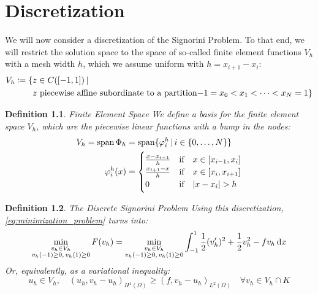 \documentclass[headsepline,footsepline,footinclude=false,oneside,fontsize=11pt,paper=a4,listof=totoc,bibliography=totoc]{scrbook} %
\newtheorem{definition}{Definition}
\begin{document}
\chapter{Discretization}
We will now consider a discretization of the Signorini Problem. To that end, we will restrict the solution space to the space of so-called finite element functions $V_h$ with a mesh width $h$, which we assume uniform with $h = x_{i+1} - x_i$:
\begin{align}
V_h \coloneqq \{&z \in C([-1,1]) \, | \, \\ 
	&z \,\, \text{piecewise affine subordinate to a partition} \mathmbox{-1}=x_0<x_1<\dots<x_N = 1 \} \nonumber
\end{align} 

\begin{definition} Finite Element Space
We define a basis for the finite element space $V_h$, which are the piecewise linear functions with a bump in the nodes:
\begin{align} \label{eq:basis_finite_element_space}
\begin{split}
V_h = \mathrm{span}\,\Phi_h &= \mathrm{span}\{\varphi_i^h \,|\, i \in \{0,\dots,N\}\} \\
\varphi_i^h (x) &= \begin{cases}
\frac{x-x_{i-1}}{h} & \text{if} \quad x\in [x_{i-1},x_i] \\
\frac{x_{i+1}-x}{h} & \text{if} \quad  x\in [x_i,x_{i+1}] \\
0 & \text{if} \quad  \abs{x-x_i} > h
\end{cases}
\end{split}
\end{align}
\end{definition}

\begin{definition} The Discrete Signorini Problem \newline
	Using this discretization, \eqref{eq:minimization_problem} turns into:
	\begin{equation} \label{eq:discrete_minimization}
	\min_{\substack{v_h \in V_h \\ v_h(-1) \geq 0,\, v_h(1) \geq 0}} F(v_h) = \min_{\substack{v_h \in V_h \\ v_h(-1) \geq 0,\, v_h(1) \geq 0}} \int_{-1}^1{\frac{1}{2} (v_h')^2 + \frac{1}{2} v_h^2 - fv_h \dif x} 
	\end{equation}
	Or, equivalently, as a variational inequality:
	\begin{equation}\label{eq:discrete_variational_inequality}
	u_h \in V_h,\quad (u_h, v_h-u_h)_{H^1(\Omega)} \geq (f, v_h - u_h)_{L^2(\Omega)} \quad \forall v_h \in V_h \cap K
	\end{equation}
	
\end{definition}
\end{document}
